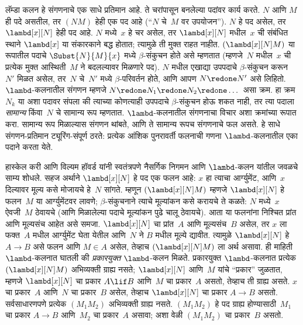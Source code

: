\documentclass[../../../include/open-logic-section]{subfiles}
\begin{document}


लॅम्डा कलन हे संगणनाचे एक साधे प्रतिमान आहे. ते चरांपासून
बनलेल्या पदांवर कार्य करते. $N$ आणि $M$ ही पदे असतील, तर
$(NM)$ हेही एक पद आहे (``$N$ चे~$M$ वर उपयोजन''). $N$ हे पद
असेल, तर $\lambd[x][N]$ हेही पद आहे. $N$ मध्ये~$x$ हे चर
असेल, तर $\lambd[x][N]$ मधील~$x$ ची संबंधित स्थाने
$\lambd[x]$ या संकारकाने बद्ध होतात; त्यामुळे ती मुक्त राहत
नाहीत. $(\lambd[x][N]M)$ या रूपातील पदाचे
$\Subst{N}{M}{x}$ मध्ये $\beta$-संकुचन होते असे म्हणतात
(म्हणजे~$N$ मधील~$x$ ची प्रत्येक मुक्त आस्थिती~$M$ ने
बदलल्यावर मिळणारे पद). $N$ मधील एखाद्या उपपदाचे
$\beta$-संकुचन करून~$N'$ मिळत असेल, तर~$N$ चे~$N'$ मध्ये
$\beta$-परिवर्तन होते, आणि आपण $N \redone N'$ असे लिहितो.
$\lambd$-कलनातील संगणन म्हणजे
$N \redone N_1 \redone N_2 \redone \dots$ असा क्रम.
हा क्रम~$N_k$ या अशा पदावर संपला की त्याच्या कोणत्याही
उपपदाचे $\beta$-संकुचन होऊ शकत नाही, तर त्या पदाला
\emph{सामान्य} किंवा~$N$ चे सामान्य रूप म्हणतात.
$\lambd$-कलनातील संगणनाचा विचार अशा क्रमांच्या रूपात करा.
सामान्य रूप मिळाल्यास संगणन थांबते, आणि ते सामान्य रूपच
संगणनाचे फल असते. हे साधे संगणन-प्रतिमान ट्यूरिंग-संपूर्ण
ठरते: प्रत्येक आंशिक पुनरावर्ती फलनाची गणना
$\lambd$-कलनातील एका पदाने करता येते.

हास्केल करी आणि विल्यम हॉवर्ड यांनी स्वतंत्रपणे नैसर्गिक
निगमन आणि $\lambd$-कलन यांतील जवळचे साम्य शोधले.
सहज अर्थाने $\lambd[x][N]$ हे पद एक फलन आहे: $x$ हा त्याचा
आर्ग्युमेंट, आणि~$x$ दिल्यावर मूल्य कसे मोजायचे हे~$N$
सांगते. म्हणून $(\lambd[x][N]M)$ म्हणजे
$\lambd[x][N]$ हे फलन~$M$ या आर्ग्युमेंटवर लावणे;
$\beta$-संकुचनाने त्याचे मूल्यांकन कसे करायचे ते कळते:
$N$ मध्ये~$x$ ऐवजी~$M$ ठेवायचे (आणि मिळालेल्या पदाचे
मूल्यांकन पुढे चालू ठेवायचे).
आता या फलनांना निश्चित प्रांत आणि मूल्यसंच आहेत असे समजा.
$\lambd[x][N]$ चा प्रांत~$A$ आणि मूल्यसंच~$B$ असेल, तर
$x$ ला फक्त~$A$ मधील आर्ग्युमेंट घेता येतील आणि~$N$ ने
$B$ मधील मूल्ये द्यावीत. त्यामुळे $\lambd[x][N]$ हे
$A \to B$ असे फलन आणि $M \in A$ असेल, तेव्हाच
$(\lambd[x][N]M)$ ला अर्थ असावा. ही माहिती
$\lambd$-कलनात घातली की \emph{प्रकारयुक्त} $\lambd$-कलन
मिळते. प्रकारयुक्त $\lambd$-कलनात प्रत्येक
$(\lambd[x][N]M)$ अभिव्यक्ती ग्राह्य नसते;
$\lambd[x][N]$ आणि~$M$ यांचे ``प्रकार'' जुळतात,
म्हणजे $\lambd[x][N]$ चा प्रकार $A \lif B$ आणि~$M$ चा
प्रकार~$A$ असतो, तेव्हाच ती ग्राह्य असते.
$x$ चा प्रकार~$A$ आणि~$N$ चा प्रकार~$B$ असेल,
तेव्हाच $\lambd[x][N]$ चा प्रकार $A \to B$ असतो.
सर्वसाधारणपणे प्रत्येक $(M_1M_2)$ अभिव्यक्ती ग्राह्य नसते.
$(M_1M_2)$ हे पद ग्राह्य होण्यासाठी~$M_1$ चा प्रकार $A \to B$
आणि~$M_2$ चा प्रकार~$A$ असावा;
अशा वेळी $(M_1M_2)$ चा प्रकार~$B$ असतो.
\end{document}
